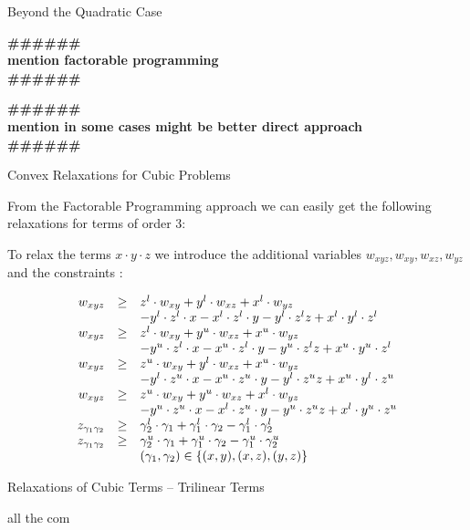 \documentclass{beamer}
\newcommand{\todo}[1]
{\begin{tiny}
  \begin{center} {\color{red}
  \textbf{ {\#\#\#\hfill\#\#\#}\\{#1}\\\#\#\#\hfill\#\#\#}}
\end{center}
\end{tiny}} %
\begin{document}
\begin{frame}{Beyond the Quadratic Case}

  \todo{mention factorable programming}

  \todo{mention in some cases might be better direct approach}

\end{frame}

\begin{frame}{Convex Relaxations for Cubic Problems}

  From the Factorable Programming approach we can easily get the following relaxations for
  terms of order 3:

  To relax the terms $x \cdot y \cdot z$ we introduce the additional variables
  $w_{xyz}, w_{xy}, w_{xz}, w_{yz}$ and the constraints : 

  \begin{displaymath}
    \begin{array}[h]{rcl}
      w_{xyz} & \geq & z^l \cdot w_{xy}+ y^l \cdot w_{xz} + x^l \cdot w_{yz} \\
     &  & -y^l \cdot z^l \cdot x - x^l \cdot z^l \cdot y - y^l \cdot z^l z 
     + x^l \cdot y^l \cdot z^l \\
      w_{xyz} & \geq & z^l \cdot w_{xy}+ y^u \cdot w_{xz} + x^u \cdot w_{yz} \\
     &  & -y^u \cdot z^l \cdot x - x^u \cdot z^l \cdot y - y^u \cdot z^l z 
     + x^u \cdot y^u \cdot z^l \\
      w_{xyz} & \geq & z^u \cdot w_{xy}+ y^l \cdot w_{xz} + x^u \cdot w_{yz} \\
     &  & -y^l \cdot z^u \cdot x - x^u \cdot z^u \cdot y - y^l \cdot z^u z 
     + x^u \cdot y^l \cdot z^u \\
      w_{xyz} & \geq & z^u \cdot w_{xy}+ y^u \cdot w_{xz} + x^l \cdot w_{yz} \\
     &  & -y^u \cdot z^u \cdot x - x^l \cdot z^u \cdot y - y^u \cdot z^u z 
     + x^l \cdot y^u \cdot z^u \\
     z_{\gamma_1 \gamma_2} & \geq & \gamma_2^l \cdot \gamma_1 + \gamma_1^l \cdot \gamma_2
     - \gamma_1^l \cdot \gamma_2^l \\
     z_{\gamma_1 \gamma_2} & \geq & \gamma_2^u \cdot \gamma_1 + \gamma_1^u \cdot \gamma_2
     - \gamma_1^u \cdot \gamma_2^u \\
     &  &  (\gamma_1, \gamma_2) \in \left\{ (x,y), (x,z), (y,z) \right\} \\
    \end{array}
  \end{displaymath}
  
\end{frame}

\begin{frame}{Relaxations of Cubic Terms -- Trilinear Terms}

  
\end{frame}

all the com
\end{document}
